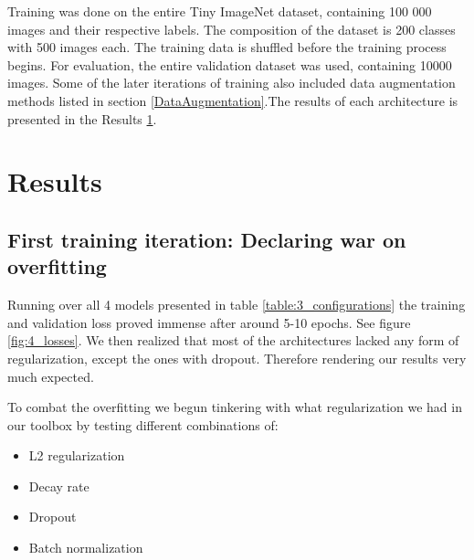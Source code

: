\documentclass{kthreport}
\begin{document}

\FloatBarrier


Training was done on the entire Tiny ImageNet dataset, containing 100 000 images and their respective labels. The composition of the dataset is 200 classes with 500 images each. The training data is shuffled before the training process begins. For evaluation, the entire validation dataset was used, containing 10000 images. Some of the later iterations of training also included data augmentation methods listed in section \ref{DataAugmentation}.The results of each architecture is presented in the Results \ref{sec:Results}.


\section{Results}
\label{sec:Results}

\subsection{First training iteration: Declaring war on overfitting}

Running over all 4 models presented in table \ref{table:3_configurations} the training and validation loss proved immense after around 5-10 epochs. See figure \ref{fig:4_losses}. We then realized that most of the architectures lacked any form of regularization, except the ones with dropout. Therefore rendering our results very much expected.


\FloatBarrier

To combat the overfitting we begun tinkering with what regularization we had in our toolbox by testing different combinations of:

\begin{itemize}

  \item L2 regularization
  \item Decay rate
  \item Dropout
  \item Batch normalization

\end{itemize}
\end{document}
